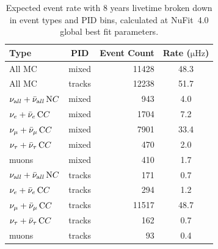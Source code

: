 %    
%    


\begin{table}[htb]
\centering
\caption{Expected event rate with 8 years livetime broken down in event types and PID bins, calculated at NuFit~4.0 global best fit parameters.}
\label{tab:event-rate}
\begin{tabular}{lcrS} \toprule
Type  & PID & Event Count & {Rate ($\mathrm{\mu Hz}$)} \\ \midrule
All MC & mixed  &   11428 &   48.3\\
All MC & tracks &   12238 &   51.7\\ \midrule
${\nu_{\rm all}} + {\bar\nu_{\rm all}} \, {\rm NC} $ & mixed  &     943 &    4.0 \\
${\nu_e} + {\bar\nu_e} \, {\rm CC}                 $ & mixed  &    1704 &    7.2 \\
${\nu_\mu} + {\bar\nu_\mu} \, {\rm CC}             $ & mixed  &    7901 &   33.4 \\
${\nu_\tau} + {\bar\nu_\tau} \, {\rm CC}           $ & mixed  &     470 &    2.0 \\
muons                                                & mixed  &     410 &    1.7 \\
\midrule
${\nu_{\rm all}} + {\bar\nu_{\rm all}} \, {\rm NC} $ & tracks &     171 &    0.7 \\
${\nu_e} + {\bar\nu_e} \, {\rm CC}                 $ & tracks &     294 &    1.2 \\
${\nu_\mu} + {\bar\nu_\mu} \, {\rm CC}             $ & tracks &   11517 &   48.7 \\
${\nu_\tau} + {\bar\nu_\tau} \, {\rm CC}           $ & tracks &     162 &    0.7 \\
muons                                                & tracks &      93 &    0.4 \\
\bottomrule
\end{tabular}
\end{table}


